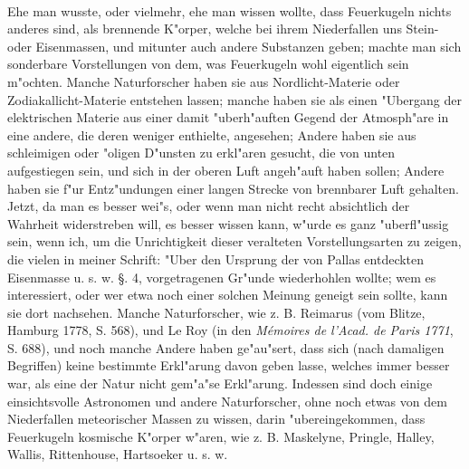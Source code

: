 \documentclass[a4paper, 11pt, oneside, polutonikogreek, german]{article}
\begin{document}
\paragraph{}
Ehe man wusste, oder vielmehr, ehe man wissen wollte, dass Feuerkugeln nichts anderes sind, als brennende K"orper, welche bei ihrem Niederfallen uns Stein- oder Eisenmassen, und mitunter auch andere Substanzen geben; machte man sich sonderbare Vorstellungen von dem, was Feuerkugeln wohl eigentlich sein m"ochten. Manche Naturforscher haben sie aus Nordlicht-Materie oder Zodiakallicht-Materie entstehen lassen; manche haben sie als einen "Ubergang der elektrischen Materie aus einer damit "uberh"auften Gegend der Atmosph"are in eine andere, die deren weniger enthielte, angesehen; Andere haben sie aus schleimigen oder "oligen D"unsten zu erkl"aren gesucht, die von unten aufgestiegen sein, und sich in der oberen Luft angeh"auft haben sollen; Andere haben sie f"ur Entz"undungen einer langen Strecke von brennbarer Luft gehalten. Jetzt, da man es besser wei"s, oder wenn man nicht recht absichtlich der Wahrheit widerstreben will, es besser wissen kann, w"urde es ganz "uberfl"ussig sein, wenn ich, um die Unrichtigkeit dieser veralteten Vorstellungsarten zu zeigen, die vielen in meiner Schrift: "Uber den Ursprung der von Pallas entdeckten Eisenmasse u. s. w. §. 4, vorgetragenen Gr"unde wiederhohlen wollte; wem es interessiert, oder wer etwa noch einer solchen Meinung geneigt sein sollte, kann sie dort nachsehen. Manche Naturforscher, wie z. B. Reimarus (vom Blitze, Hamburg 1778, S. 568), und Le Roy (in den \emph{Mémoires de l'Acad. de Paris 1771}, S. 688), und noch manche Andere haben ge"au"sert, dass sich (nach damaligen Begriffen) keine bestimmte Erkl"arung davon geben lasse, welches immer besser war, als eine der Natur nicht gem"a"se Erkl"arung. Indessen sind doch einige einsichtsvolle Astronomen und andere Naturforscher, ohne noch etwas von dem Niederfallen meteorischer Massen zu wissen, darin "ubereingekommen, dass Feuerkugeln kosmische K"orper w"aren, wie z. B. Maskelyne, Pringle, Halley, Wallis, Rittenhouse, Hartsoeker u. s. w.
\subsection{}
\end{document}
